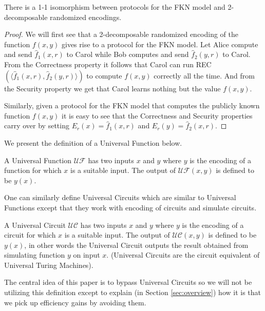 \begin{lemma}
\label{lemma:FKN2decomp}
There is  a 1-1  isomorphism between protocols  for the FKN  model and
2-decomposable randomized encodings.
\end{lemma}
\begin{proof}
  We will first  see that a 2-decomposable randomized  encoding of the
  function $f(x,y)$  gives rise to a  protocol for the  FKN model. Let
  Alice compute and send  $\hat{f}_1(x,r)$ to Carol while Bob computes
  and send $\hat{f}_2(y,r)$ to Carol. From the Correctness property it
  follows    that    Carol    can   run    REC$(\langle\hat{f}_1(x,r),
  \hat{f}_2(y,r)\rangle)$  to  compute   $f(x,y)$  correctly  all  the
  time.  And from  the  Security  property we  get  that Carol  learns
  nothing but the value $f(x,y)$.

  Similarly,  given a  protocol for  the FKN  model that  computes the
  publicly  known  function  $f(x,y)$  it  is easy  to  see  that  the
  Correctness and Security properties  carry over by setting $E_r(x) =
  \hat{f}_1(x,r)$ and $E_r(y) = \hat{f}_2(x,r)$.
\end{proof}

We present  the definition of  a Universal Function below.  

\begin{definition}
A Universal Function $\mathcal{UF}$ has  two inputs $x$ and  $y$ where
$y$ is  the encoding of a function  for which $x$ is  a suitable input.
The output  of $\mathcal{UF}(x,y)$ is  defined to be $y(x)$.
\end{definition}

One  can similarly  define  Universal Circuits  which  are similar  to
Universal Functions  except that they  work with encoding  of circuits
and simulate circuits.
\begin{definition}
A Universal Circuit $\mathcal{UC}$ has  two inputs $x$ and  $y$ where
$y$ is  the encoding of a circuit  for which $x$ is  a suitable input.
The output  of $\mathcal{UC}(x,y)$ is  defined to be $y(x)$,  in other
words  the   Universal  Circuit  outputs  the   result  obtained  from
simulating  function $y$  on  input $x$.  (Universal  Circuits are  the
circuit equivalent of Universal Turing Machines).
\end{definition}

The central idea  of this paper is to bypass  Universal Circuits so we
will not  be utilizing this  definition except to explain  (in Section
\ref{sec:overview})  how it  is that  we pick  up efficiency  gains by
avoiding them.


